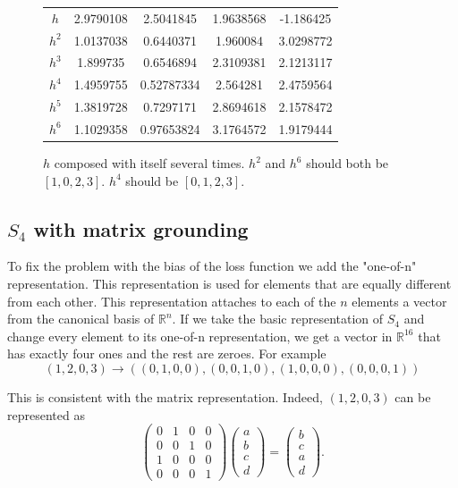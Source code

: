 \begin{figure}
\center
\caption{$h$ composed with itself several times. $h^2$ and $h^6$ should both be $[1,0,2,3]$. $h^4$ should be $[0,1,2,3]$.}
\label{table:s4_half_basic_gen}
\begin{tabular}{c|cccc}
$h$   & 2.9790108 & 2.5041845 & 1.9638568 & -1.186425\\
$h^2$ & 1.0137038 & 0.6440371 & 1.960084 & 3.0298772\\
$h^3$ & 1.899735 & 0.6546894 & 2.3109381 & 2.1213117\\
$h^4$ & 1.4959755 & 0.52787334 & 2.564281 & 2.4759564\\
$h^5$ & 1.3819728 & 0.7297171 & 2.8694618 & 2.1578472\\
$h^6$ & 1.1029358 & 0.97653824 & 3.1764572 & 1.9179444\\

\end{tabular}
\end{figure}

\subsection{$S_4$ with matrix grounding}
To fix the problem with the bias of the loss function we add the "one-of-n" representation. This representation is used for elements that are equally different from each other. This representation attaches to each of the $n$ elements a vector from the canonical basis of $\mathbb{R}^n$. If we take the basic representation of $S_4$ and change every element to its one-of-n representation, we get a vector in $\mathbb{R}^{16}$ that has exactly four ones and the rest are zeroes. For example 
$$(1,2,0,3)\rightarrow \left((0,1,0,0),(0,0,1,0),(1,0,0,0),(0,0,0,1)\right)$$

This is consistent with the matrix representation. Indeed, $(1,2,0,3)$ can be represented as
$$
\left(
\begin{matrix}
0 & 1 & 0 & 0\\
0 & 0 & 1 & 0\\
1 & 0 & 0 & 0\\
0 & 0 & 0 & 1
\end{matrix}
\right)
\left(
\begin{matrix}
a\\
b\\
c\\
d
\end{matrix}
\right)
=
\left(
\begin{matrix}
b\\
c\\
a\\
d
\end{matrix}
\right).
$$

